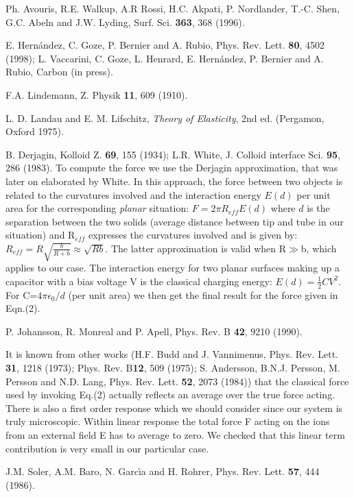 \begin{multicols}{2}
\begin{thebibliography}{99}
 Ph. Avouris, R.E. Walkup, A.R Rossi, H.C. Akpati, P.
Nordlander, T.-C. Shen, G.C. Abeln and J.W. Lyding, Surf. Sci.
{\bf 363}, 368 (1996).

  E. Hern\'{a}ndez, C. Goze, P. Bernier and A. Rubio,
Phys. Rev. Lett. {\bf 80}, 4502 (1998); L. Vaccarini, C. Goze, L.
Henrard, E. Hern\'{a}ndez, P. Bernier and A. Rubio, Carbon  (in press).


  F.A. Lindemann, Z. Physik {\bf 11}, 609 (1910).


  L. D. Landau and E. M. Lifschitz, {\em Theory of Elasticity},
2nd ed. (Pergamon, Oxford 1975).

  B. Derjagin, Kolloid Z. {\bf 69}, 155 (1934);
L.R. White, J. Colloid interface Sci. {\bf 95}, 286 (1983).
To compute the force we use the
Derjagin approximation, that was later on elaborated by
White. In this approach, the force between two
objects is related to the curvatures involved and the interaction
energy $E(d)$ per unit area for the corresponding {\em planar}
situation: $F= 2\pi R_{eff}E(d)$
where $d$ is the separation between the two solids (average distance
between tip and tube in our situation) and R$_{eff}$ expresses the
curvatures involved and is given by:
$ R_{eff}=R\sqrt{\frac{b}{R+b}}\approx \sqrt{Rb}$.
The latter approximation is valid when R$\gg $b, which applies to
our case. The interaction energy for two planar surfaces making up
a capacitor with a bias voltage  V is the classical charging
energy: $E(d)=\frac{1}{2}CV^{2}$.
For C=$4\pi \epsilon _{0}/d$ (per unit area) we then get the final
result for the force given in Eqn.(2).

  P. Johansson, R. Monreal and P. Apell, Phys. Rev. B{\bf %
42}, 9210 (1990).

 It is known from other works
(H.F. Budd and J. Vannimenus, Phys. Rev. Lett. {\bf 31}, 1218
(1973); Phys. Rev. B{\bf 12}, 509 (1975);
S. Andersson, B.N.J. Persson, M. Persson and N.D. Lang,
Phys. Rev. Lett. {\bf 52}, 2073 (1984))
that the classical
force used by invoking Eq.(2) actually reflects an average over the true
force acting. There is also a first order
response which we should consider since our system is truly microscopic.
Within linear response the total force F acting on the ions  from an
external field E has to average to zero. We checked that
this linear term contribution is very small in our particular case.


  J.M. Soler, A.M. Baro, N. Garc\'\i a and H. Rohrer, Phys. Rev.
Lett. {\bf 57}, 444 (1986).


\end{thebibliography}
\end{multicols}
